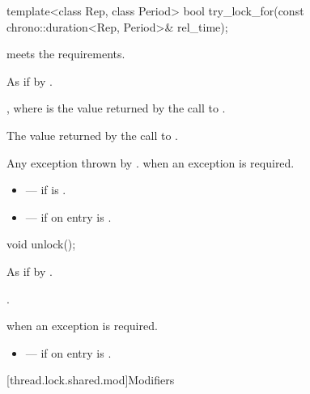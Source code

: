 %
\begin{itemdecl}
template<class Rep, class Period>
  bool try_lock_for(const chrono::duration<Rep, Period>& rel_time);
\end{itemdecl}

\begin{itemdescr}
\pnum
\expects
{} meets the 
requirements.

\pnum
\effects
As if by .

\pnum
\ensures
{}, where  is the value returned by the call to .

\pnum
\returns
The value returned by the call to .

\pnum
\throws
Any exception thrown by .  when an exception is required.

\pnum
\errors
\begin{itemize}
\item {} --- if  is .
\item {} --- if on entry  is
.
\end{itemize}
\end{itemdescr}

%
\begin{itemdecl}
void unlock();
\end{itemdecl}

\begin{itemdescr}
\pnum
\effects
As if by .

\pnum
\ensures
{}.

\pnum
\throws
{} when an exception is required.

\pnum
\errors
\begin{itemize}
\item {} --- if on entry  is
.
\end{itemize}
\end{itemdescr}

[thread.lock.shared.mod]{Modifiers}

